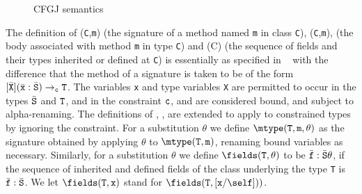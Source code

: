 \begin{figure*}

\quad







{
 \derives {}
}




\caption{CFGJ semantics}
\label{CFGJ-red-rules}
\end{figure*}


The definition of {\mtype({\tt C},{\tt m})} (the signature of a method
named {\tt m} in class {\tt C}), {\mbody({\tt C},{\tt m})}, (the body
associated with method {\tt m} in type {\tt C}) and \fields(C) (the
sequence of fields and their types inherited or defined at {\tt C}) is
essentially as specified in \FJ{}~\cite{FJ} with the difference that the
method of a signature is taken to be of the form
$[\bar{\tt X}](\TY{\bar{\tt S}}{\bar{\tt x}}) \to_{\tt c} {\tt T}$.
The variables {\tt x} and type variables {\tt X} are permitted
to occur in the types $\bar{\tt S}$ and ${\tt T}$, and in the
constraint ${\tt c}$, and are considered bound,
and subject to alpha-renaming.  The definitions of \mtype, \mbody,
\fields{} are extended to apply to constrained types by ignoring the
constraint.  For a substitution $\theta$ we define $\mtype({\tt
T},{\tt m},\theta)$ as the signature obtained by applying $\theta$ to
$\mtype({\tt T},{\tt m})$, renaming bound variables as necessary.
Similarly, for a substitution $\theta$ we define $\fields({\tt
T},\theta)$ to be $\TY{\bar{\tt S}\theta}{\bar{\tt f}}$, if the sequence of
inherited and defined fields of the class underlying the type {\tt T}
is $\TY{\bar{\tt S}}{\bar{\tt f}}$. We let $\fields({\tt T},{\tt x})$ stand for
$\fields({\tt T},[{\tt x}/\self]))$.

